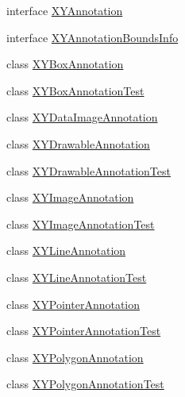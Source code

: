 \begin{DoxyCompactItemize}
\item 
interface \mbox{\hyperlink{interfaceorg_1_1jfree_1_1chart_1_1annotations_1_1_x_y_annotation}{X\+Y\+Annotation}}
\item 
interface \mbox{\hyperlink{interfaceorg_1_1jfree_1_1chart_1_1annotations_1_1_x_y_annotation_bounds_info}{X\+Y\+Annotation\+Bounds\+Info}}
\item 
class \mbox{\hyperlink{classorg_1_1jfree_1_1chart_1_1annotations_1_1_x_y_box_annotation}{X\+Y\+Box\+Annotation}}
\item 
class \mbox{\hyperlink{classorg_1_1jfree_1_1chart_1_1annotations_1_1_x_y_box_annotation_test}{X\+Y\+Box\+Annotation\+Test}}
\item 
class \mbox{\hyperlink{classorg_1_1jfree_1_1chart_1_1annotations_1_1_x_y_data_image_annotation}{X\+Y\+Data\+Image\+Annotation}}
\item 
class \mbox{\hyperlink{classorg_1_1jfree_1_1chart_1_1annotations_1_1_x_y_drawable_annotation}{X\+Y\+Drawable\+Annotation}}
\item 
class \mbox{\hyperlink{classorg_1_1jfree_1_1chart_1_1annotations_1_1_x_y_drawable_annotation_test}{X\+Y\+Drawable\+Annotation\+Test}}
\item 
class \mbox{\hyperlink{classorg_1_1jfree_1_1chart_1_1annotations_1_1_x_y_image_annotation}{X\+Y\+Image\+Annotation}}
\item 
class \mbox{\hyperlink{classorg_1_1jfree_1_1chart_1_1annotations_1_1_x_y_image_annotation_test}{X\+Y\+Image\+Annotation\+Test}}
\item 
class \mbox{\hyperlink{classorg_1_1jfree_1_1chart_1_1annotations_1_1_x_y_line_annotation}{X\+Y\+Line\+Annotation}}
\item 
class \mbox{\hyperlink{classorg_1_1jfree_1_1chart_1_1annotations_1_1_x_y_line_annotation_test}{X\+Y\+Line\+Annotation\+Test}}
\item 
class \mbox{\hyperlink{classorg_1_1jfree_1_1chart_1_1annotations_1_1_x_y_pointer_annotation}{X\+Y\+Pointer\+Annotation}}
\item 
class \mbox{\hyperlink{classorg_1_1jfree_1_1chart_1_1annotations_1_1_x_y_pointer_annotation_test}{X\+Y\+Pointer\+Annotation\+Test}}
\item 
class \mbox{\hyperlink{classorg_1_1jfree_1_1chart_1_1annotations_1_1_x_y_polygon_annotation}{X\+Y\+Polygon\+Annotation}}
\item 
class \mbox{\hyperlink{classorg_1_1jfree_1_1chart_1_1annotations_1_1_x_y_polygon_annotation_test}{X\+Y\+Polygon\+Annotation\+Test}}
\item 

\end{DoxyCompactItemize}
